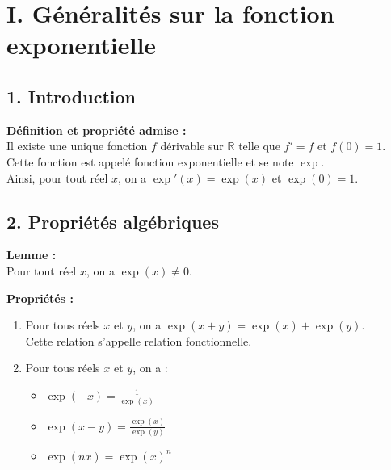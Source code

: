 \documentclass[11pt,a4paper]{article}
\title{\doctitre}
\author{\docniveau \\ \doctheme\text{ - }\doctype}
\date{}
\begin{document}
\maketitle
\pagestyle{custom}
\thispagestyle{custom}

\section*{I. Généralités sur la fonction exponentielle}
\subsection*{1. Introduction}

\begin{mdframed}[style=definitionStyle]
    \textbf{Définition et propriété admise :} ~\\
    Il existe une unique fonction $f$ dérivable sur $\mathbb{R}$ telle que $f'=f$ et $f(0)=1$. \\
    Cette fonction est appelé fonction exponentielle et se note $\exp$. \\
    Ainsi, pour tout réel $x$, on a $\exp'(x)=\exp(x)$ et $\exp(0)=1$.
\end{mdframed}

\subsection*{2. Propriétés algébriques}

\begin{mdframed}[style=proprieteStyle]
    \textbf{Lemme :} ~\\
    Pour tout réel $x$, on a $\exp(x)\not=0$.
\end{mdframed}

\begin{mdframed}[style=proprieteStyle]
    \textbf{Propriétés :}
    \begin{enumerate}
        \item Pour tous réels $x$ et $y$, on a $\exp(x+y)=\exp(x)+\exp(y)$. \\
        Cette relation s'appelle relation fonctionnelle.
        \item Pour tous réels $x$ et $y$, on a :
        \begin{itemize}
            \item $\displaystyle\exp(-x)=\frac{1}{\exp(x)}$
            \item $\displaystyle\exp(x-y)=\frac{\exp(x)}{\exp(y)}$ 
            \item $\displaystyle\exp(nx)=\exp(x)^n$ 
        \end{itemize}
    \end{enumerate}
\end{mdframed}
\end{document}
